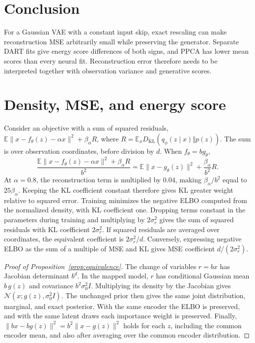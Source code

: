 \documentclass{article}
\newcommand{\E}{\mathbb{E}}
\newcommand{\KL}{D_{\mathrm{KL}}}
\begin{document}
\section{Conclusion}
For a Gaussian VAE with a constant input skip, exact rescaling can make reconstruction MSE arbitrarily small while preserving the generator. Separate DART fits give energy score differences of both signs, and PPCA has lower mean scores than every neural fit. Reconstruction error therefore needs to be interpreted together with observation variance and generative scores.

\clearpage



\clearpage
\appendix
\setlength{\LTcapwidth}{\linewidth}
\section{Density, MSE, and energy score}
Consider an objective with a sum of squared residuals, $\E\|x-f_\theta(z)-\alpha x\|^2+\beta_\alpha R$, where $R=\E_x\KL(q_\phi(z\mid x)\Vert p(z))$. The sum is over observation coordinates, before division by $d$. When $f_\theta=b g_\theta$,
\begin{equation}
\frac{\E\|x-f_\theta(z)-\alpha x\|^2+\beta_\alpha R}{b^2}
=\E\|x-g_\theta(z)\|^2+\frac{\beta_\alpha}{b^2}R.
\label{eq:scale}
\end{equation}
At $\alpha=0.8$, the reconstruction term is multiplied by $0.04$, making $\beta_\alpha/b^2$ equal to $25\beta_\alpha$. Keeping the KL coefficient constant therefore gives KL greater weight relative to squared error. Training minimizes the negative ELBO computed from the normalized density, with KL coefficient one. Dropping terms constant in the parameters during training and multiplying by $2\sigma_r^2$ gives the sum of squared residuals with KL coefficient $2\sigma_r^2$. If squared residuals are averaged over coordinates, the equivalent coefficient is $2\sigma_r^2/d$. Conversely, expressing negative ELBO as the sum of a multiple of MSE and KL gives MSE coefficient $d/(2\sigma_r^2)$.

\begin{proof}[Proof of Proposition~\ref{prop:equivalence}]
The change of variables $r=bx$ has Jacobian determinant $b^d$. In the mapped model, $r$ has conditional Gaussian mean $b\,g(z)$ and covariance $b^2\sigma_0^2I$. Multiplying its density by the Jacobian gives $\mathcal{N}(x;g(z),\sigma_0^2I)$. The unchanged prior then gives the same joint distribution, marginal, and exact posterior. With the same encoder the ELBO is preserved, and with the same latent draws each importance weight is preserved. Finally, $\|b x-b g(z)\|^2=b^2\|x-g(z)\|^2$ holds for each $z$, including the common encoder mean, and also after averaging over the common encoder distribution.
\end{proof}
\end{document}
